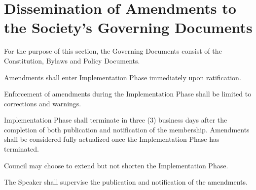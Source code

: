 \section{Dissemination of Amendments to the Society's Governing Documents}
\begin{longenum}[ label*=\thesection.\arabic*., align=left]
	\item For the purpose of this section, the Governing Documents consist of the Constitution, Bylaws and Policy Documents.
    \item Amendments shall enter Implementation Phase immediately upon ratification. 
    \item Enforcement of amendments during the Implementation Phase shall be limited to corrections and warnings. 
    \item Implementation Phase shall terminate in three (3) business days after the completion of both publication and notification of the membership. Amendments shall be considered fully actualized once the Implementation Phase has terminated.
    \item Council may choose to extend but not shorten the Implementation Phase. 
    \item The Speaker shall supervise the publication and notification of the amendments.
\end{longenum}
\newpage
{}
